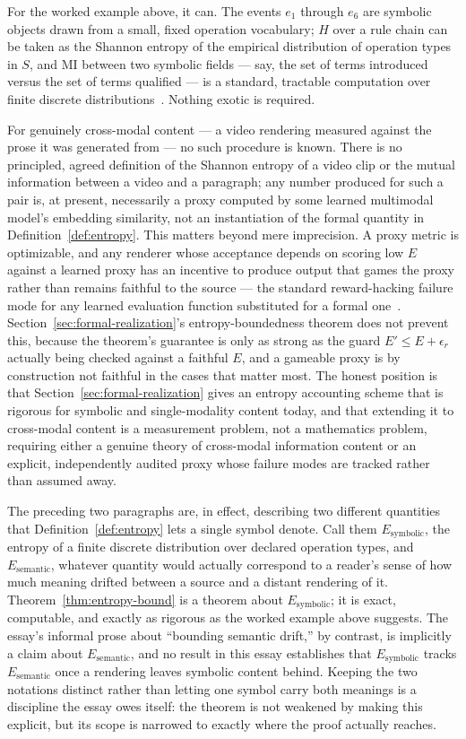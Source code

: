 \documentclass[11pt]{article}
\theoremstyle{definition}
\begin{document}
For the worked example above, it can. The events $e_1$ through $e_6$ are symbolic objects drawn from a small, fixed operation vocabulary; $H$ over a rule chain can be taken as the Shannon entropy of the empirical distribution of operation types in $S$, and $\mathrm{MI}$ between two symbolic fields --- say, the set of terms introduced versus the set of terms qualified --- is a standard, tractable computation over finite discrete distributions~\cite{shannon1948}. Nothing exotic is required.

For genuinely cross-modal content --- a video rendering measured against the prose it was generated from --- no such procedure is known. There is no principled, agreed definition of the Shannon entropy of a video clip or the mutual information between a video and a paragraph; any number produced for such a pair is, at present, necessarily a proxy computed by some learned multimodal model's embedding similarity, not an instantiation of the formal quantity in Definition~\ref{def:entropy}. This matters beyond mere imprecision. A proxy metric is optimizable, and any renderer whose acceptance depends on scoring low $E$ against a learned proxy has an incentive to produce output that games the proxy rather than remains faithful to the source --- the standard reward-hacking failure mode for any learned evaluation function substituted for a formal one~\cite{amodei2016}. Section~\ref{sec:formal-realization}'s entropy-boundedness theorem does not prevent this, because the theorem's guarantee is only as strong as the guard $E' \leq E + \epsilon_r$ actually being checked against a faithful $E$, and a gameable proxy is by construction not faithful in the cases that matter most. The honest position is that Section~\ref{sec:formal-realization} gives an entropy accounting scheme that is rigorous for symbolic and single-modality content today, and that extending it to cross-modal content is a measurement problem, not a mathematics problem, requiring either a genuine theory of cross-modal information content or an explicit, independently audited proxy whose failure modes are tracked rather than assumed away.

The preceding two paragraphs are, in effect, describing two different quantities that Definition~\ref{def:entropy} lets a single symbol denote. Call them $E_{\mathrm{symbolic}}$, the entropy of a finite discrete distribution over declared operation types, and $E_{\mathrm{semantic}}$, whatever quantity would actually correspond to a reader's sense of how much meaning drifted between a source and a distant rendering of it. Theorem~\ref{thm:entropy-bound} is a theorem about $E_{\mathrm{symbolic}}$; it is exact, computable, and exactly as rigorous as the worked example above suggests. The essay's informal prose about ``bounding semantic drift,'' by contrast, is implicitly a claim about $E_{\mathrm{semantic}}$, and no result in this essay establishes that $E_{\mathrm{symbolic}}$ tracks $E_{\mathrm{semantic}}$ once a rendering leaves symbolic content behind. Keeping the two notations distinct rather than letting one symbol carry both meanings is a discipline the essay owes itself: the theorem is not weakened by making this explicit, but its scope is narrowed to exactly where the proof actually reaches.
\end{document}

